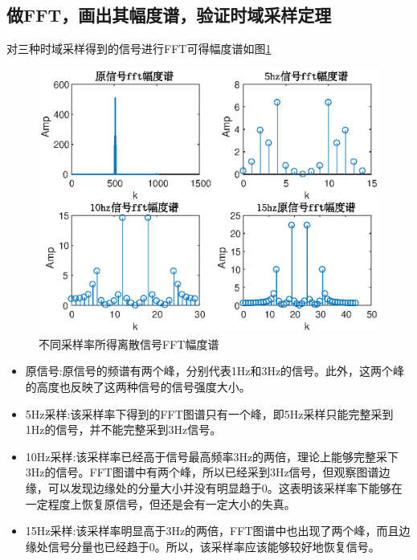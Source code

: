 \documentclass[UTF8]{article}
\begin{document}
\begin{CJK}{UTF8}{gkai}
\subsection{做FFT，画出其幅度谱，验证时域采样定理}
对三种时域采样得到的信号进行FFT可得幅度谱如图\ref{pro2_fig2}
\begin{figure}
  \centering
  \includegraphics[scale=0.7]{pro2_subpro2.eps}
  \caption{不同采样率所得离散信号FFT幅度谱}
  \label{pro2_fig2}
\end{figure}
\begin{itemize}
  \item 原信号:原信号的频谱有两个峰，分别代表1Hz和3Hz的信号。此外，这两个峰的高度也反映了这两种信号的信号强度大小。
  \item 5Hz采样:该采样率下得到的FFT图谱只有一个峰，即5Hz采样只能完整采到1Hz的信号，并不能完整采到3Hz信号。
  \item 10Hz采样:该采样率已经高于信号最高频率3Hz的两倍，理论上能够完整采下3Hz的信号。FFT图谱中有两个峰，所以已经采到3Hz信号，但观察图谱边缘，可以发现边缘处的分量大小并没有明显趋于0。这表明该采样率下能够在一定程度上恢复原信号，但还是会有一定大小的失真。
  \item 15Hz采样:该采样率明显高于3Hz的两倍，FFT图谱中也出现了两个峰，而且边缘处信号分量也已经趋于0。所以，该采样率应该能够较好地恢复信号。
\end{itemize}


\end{CJK}
\end{document}
